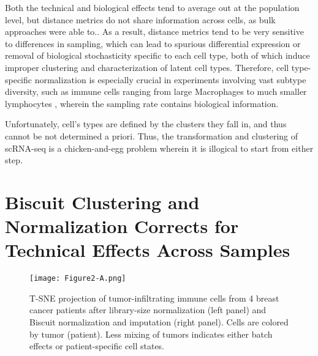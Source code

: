 Both the technical and biological effects tend to average out at the population level, but distance metrics do not share information across cells, as bulk approaches were able to..
As a result, distance metrics tend to be very sensitive to differences in sampling, which can lead to spurious differential expression or removal of biological stochasticity specific to each cell type, both of which induce improper clustering and characterization of latent cell types.
Therefore, cell type-specific normalization is especially crucial in experiments involving vast subtype diversity, such as immune cells ranging from large Macrophages to much smaller lymphocytes \citep{Lun2016,Vallejos2017}, wherein the sampling rate contains biological information. 

Unfortunately, cell's types are defined by the clusters they fall in, and thus cannot be not determined a priori. 
Thus, the transformation and clustering of scRNA-seq is a chicken-and-egg problem wherein it is illogical to start from either step.

\section{Biscuit Clustering and Normalization Corrects for Technical Effects Across Samples}

\begin{figure}
\centering
\texttt{[image: Figure2-A.png]}
\caption{T-SNE projection of tumor-infiltrating immune cells from 4 breast cancer patients after library-size normalization (left panel) and Biscuit normalization and imputation (right panel). Cells are colored by tumor (patient). Less mixing of tumors indicates either batch effects or patient-specific cell states.
}
\label{fig:2a}
\end{figure}

